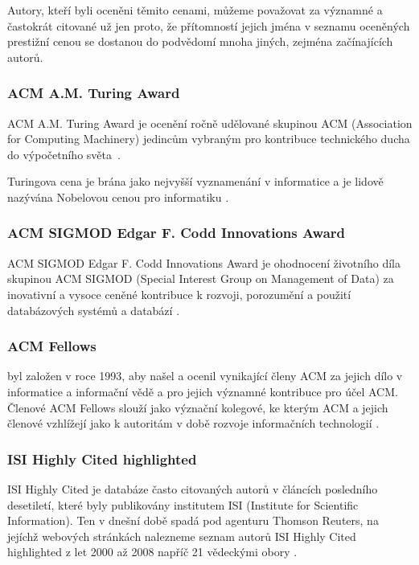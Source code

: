 \documentclass{bakalarka}
\begin{document}
Autory, kteří byli oceněni těmito cenami, můžeme považovat za významné a
častokrát citované už jen proto, že přítomností jejich jména v seznamu
oceněných prestižní cenou se dostanou do podvědomí mnoha jiných, zejména
začínajících autorů.

\subsubsection{ACM A.M. Turing Award}
ACM A.M. Turing Award je ocenění ročně udělované skupinou ACM (Association for
Computing Machinery) jedincům vybraným pro kontribuce technického ducha do
výpočetního světa~\citep{turingaward}.

Turingova cena je brána jako nejvyšší vyznamenání v informatice a je lidově
nazývána Nobelovou cenou pro informatiku \citep{dasgupta}.

\subsubsection{ACM SIGMOD Edgar F. Codd Innovations Award}
ACM SIGMOD Edgar F. Codd Innovations Award je ohodnocení životního díla
skupinou ACM SIGMOD (Special Interest Group on Management of Data) za
inovativní a vysoce ceněné kontribuce k rozvoji, porozumění a použití
databázových systémů a databází \citep{sigmodinnovations}.

\subsubsection{ACM Fellows}
 byl založen v roce 1993, aby našel a ocenil
vynikající členy ACM za jejich dílo v informatice a informační vědě a pro
jejich významné kontribuce pro účel ACM. Členové ACM Fellows slouží jako
význační kolegové, ke kterým ACM a jejich členové vzhlížejí jako k autoritám v
době rozvoje informačních technologií \citep{acmfellows}.

\subsubsection{ISI Highly Cited highlighted}
ISI Highly Cited je databáze často citovaných autorů v článcích posledního
desetiletí, které byly publikovány institutem ISI (Institute for Scientific
Information). Ten v dnešní době spadá pod agenturu Thomson Reuters, na jejíchž
webových stránkách nalezneme seznam autorů ISI Highly Cited highlighted z let
2000 až 2008 napříč 21 vědeckými obory \citep{highlycited}.
\end{document}
